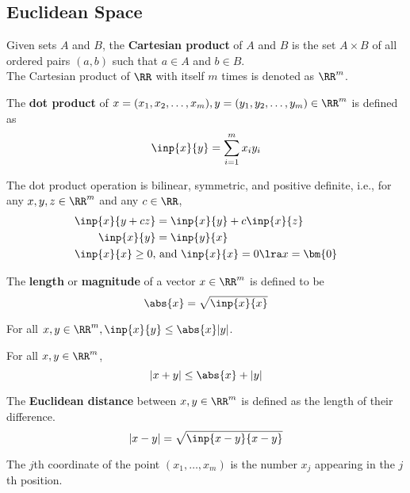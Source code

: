 \documentclass[11pt]{scrartcl}
\begin{document}
\subsection{Euclidean Space}
\label{subsec:eusp}
\begin{definition}
  Given sets $A$ and $B$, the \textbf{Cartesian product} of $A$ and
  $B$ is the set $A\times B$ of all ordered pairs $(a,b)$ such that
  $a\in A$ and $b\in B$.\\
  The Cartesian product of $\RR$ with itself $m$ times is denoted as
  $\RR^m$.
\end{definition}
\begin{definition}
  The \textbf{dot product} of $x = (x_1,x_2,\dots, x_m),y=(y_1,y_2,\dots, y_m) \in \RR^m$ is defined as
  \[ \inp{x}{y} = \sum_{i=1}^mx_iy_i  \]
\end{definition}
\begin{lemma}
  The dot product operation is bilinear, symmetric, and positive
  definite, i.e., for any $x,y,z\in\RR^m$ and any $c\in\RR$,
  \begin{align}
    \inp{x}{y+cz} &= \inp{x}{y} + c \inp{x}{z}\\
    \inp{x}{y} &= \inp{y}{x}\\
    \inp{x}{x} \geq 0, &\text{\ and\ }\inp{x}{x} = 0 \lra x=\bm{0}
  \end{align}
\end{lemma}
\begin{definition}

  The \textbf{length} or \textbf{magnitude} of a vector $x\in\RR^m$ is
  defined to be
  \[ \abs{x} = \sqrt{\inp{x}{x}}  \]
\end{definition}
\begin{theorem}
For all $x,y\in \RR^m, \inp{x}{y} \leq \abs{x}|y|$.
\end{theorem}
\begin{corollary}
  For all $x,y\in\RR^m$,
  \[ |x+y| \leq \abs{x} + |y| \]
\end{corollary}
\begin{definition}
  The \textbf{Euclidean distance} between $x,y\in\RR^m$ is defined as
  the length of their difference.
  \[ |x-y| = \sqrt{\inp{x-y}{x-y}} \]
\end{definition}
\begin{definition}
  The $j$th coordinate of the point $(x_1,\dots, x_m)$ is the number
  $x_j$ appearing in the $j$th position.
\end{definition}
\end{document}
